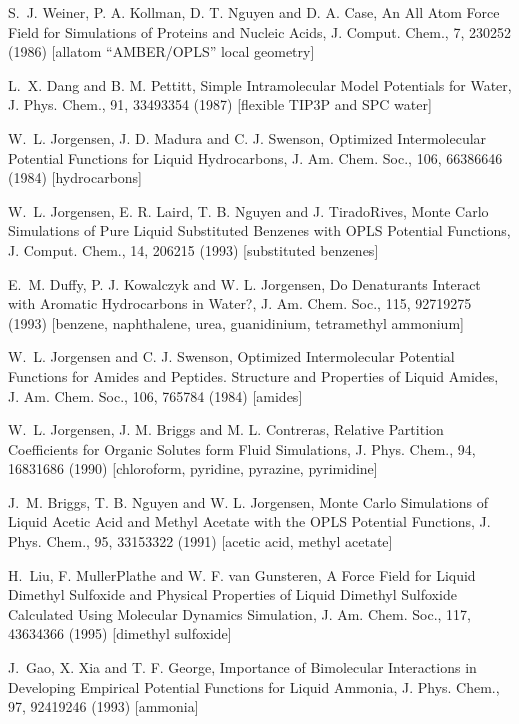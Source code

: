 \documentclass[letterpaper,11pt,english]{sphinxmanual}
\begin{document}
S. J. Weiner, P. A. Kollman, D. T. Nguyen and D. A. Case, An All Atom Force Field for Simulations of Proteins and Nucleic Acids, J. Comput. Chem., 7, 230\sphinxhyphen{}252 (1986)  {[}all\sphinxhyphen{}atom “AMBER/OPLS” local geometry{]}

L. X. Dang and B. M. Pettitt, Simple Intramolecular Model Potentials for Water, J. Phys. Chem., 91, 3349\sphinxhyphen{}3354 (1987)  {[}flexible TIP3P and SPC water{]}

W. L. Jorgensen, J. D. Madura and C. J. Swenson, Optimized Intermolecular Potential Functions for Liquid Hydrocarbons, J. Am. Chem. Soc., 106, 6638\sphinxhyphen{}6646 (1984)  {[}hydrocarbons{]}

W. L. Jorgensen, E. R. Laird, T. B. Nguyen and J. Tirado\sphinxhyphen{}Rives, Monte Carlo Simulations of Pure Liquid Substituted Benzenes with OPLS Potential Functions, J. Comput. Chem., 14, 206\sphinxhyphen{}215 (1993)  {[}substituted benzenes{]}

E. M. Duffy, P. J. Kowalczyk and W. L. Jorgensen, Do Denaturants Interact with Aromatic Hydrocarbons in Water?, J. Am. Chem. Soc., 115, 9271\sphinxhyphen{}9275 (1993)  {[}benzene, naphthalene, urea, guanidinium, tetramethyl ammonium{]}

W. L. Jorgensen and C. J. Swenson, Optimized Intermolecular Potential Functions for Amides and Peptides. Structure and Properties of Liquid Amides, J. Am. Chem. Soc., 106, 765\sphinxhyphen{}784 (1984)  {[}amides{]}

W. L. Jorgensen, J. M. Briggs and M. L. Contreras, Relative Partition Coefficients for Organic Solutes form Fluid Simulations, J. Phys. Chem., 94, 1683\sphinxhyphen{}1686 (1990)  {[}chloroform, pyridine, pyrazine, pyrimidine{]}

J. M. Briggs, T. B. Nguyen and W. L. Jorgensen, Monte Carlo Simulations of Liquid Acetic Acid and Methyl Acetate with the OPLS Potential Functions, J. Phys. Chem., 95, 3315\sphinxhyphen{}3322 (1991)  {[}acetic acid, methyl acetate{]}

H. Liu, F. Muller\sphinxhyphen{}Plathe and W. F. van Gunsteren, A Force Field for Liquid Dimethyl Sulfoxide and Physical Properties of Liquid Dimethyl Sulfoxide Calculated Using Molecular Dynamics Simulation, J. Am. Chem. Soc., 117, 4363\sphinxhyphen{}4366 (1995)  {[}dimethyl sulfoxide{]}

J. Gao, X. Xia and T. F. George, Importance of Bimolecular Interactions in Developing Empirical Potential Functions for Liquid Ammonia, J. Phys. Chem., 97, 9241\sphinxhyphen{}9246 (1993)  {[}ammonia{]}
\end{document}

